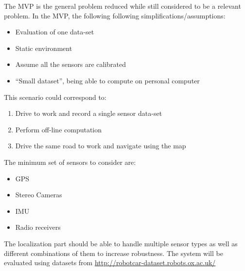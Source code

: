 The \gls{MVP} is the general problem reduced while still considered to be a relevant problem. In the \gls{MVP}, the following following simplifications/assumptions:
\begin{itemize}
\item Evaluation of one data-set
\item Static environment
\item Assume all the sensors are calibrated
\item ``Small dataset'', being able to compute on personal computer
\end{itemize}
This scenario could correspond to:
\begin{enumerate}
\item Drive to work and record a single sensor data-set
\item Perform off-line computation
\item Drive the same road to work and navigate using the map
\end{enumerate}
The minimum set of sensors to consider are:
\begin{itemize}
\item GPS
\item Stereo Cameras
\item IMU
\item Radio receivers
\end{itemize}

The localization part should be able to handle multiple sensor types as well as different combinations of them to increase robustness. The system will be evaluated using datasets from
\url{http://robotcar-dataset.robots.ox.ac.uk/}

